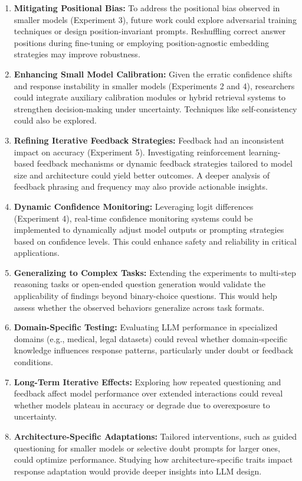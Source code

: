 \begin{enumerate}
    \item \textbf{Mitigating Positional Bias:} To address the positional bias observed in smaller models (Experiment 3), future work could explore adversarial training techniques or design position-invariant prompts. Reshuffling correct answer positions during fine-tuning or employing position-agnostic embedding strategies may improve robustness.
    
    \item \textbf{Enhancing Small Model Calibration:} Given the erratic confidence shifts and response instability in smaller models (Experiments 2 and 4), researchers could integrate auxiliary calibration modules or hybrid retrieval systems to strengthen decision-making under uncertainty. Techniques like self-consistency could also be explored.
    
    \item \textbf{Refining Iterative Feedback Strategies:} Feedback had an inconsistent impact on accuracy (Experiment 5). Investigating reinforcement learning-based feedback mechanisms or dynamic feedback strategies tailored to model size and architecture could yield better outcomes. A deeper analysis of feedback phrasing and frequency may also provide actionable insights.
    
    \item \textbf{Dynamic Confidence Monitoring:} Leveraging logit differences (Experiment 4), real-time confidence monitoring systems could be implemented to dynamically adjust model outputs or prompting strategies based on confidence levels. This could enhance safety and reliability in critical applications.
    
    \item \textbf{Generalizing to Complex Tasks:} Extending the experiments to multi-step reasoning tasks or open-ended question generation would validate the applicability of findings beyond binary-choice questions. This would help assess whether the observed behaviors generalize across task formats.
    
    \item \textbf{Domain-Specific Testing:} Evaluating LLM performance in specialized domains (e.g., medical, legal datasets) could reveal whether domain-specific knowledge influences response patterns, particularly under doubt or feedback conditions.
    
    \item \textbf{Long-Term Iterative Effects:} Exploring how repeated questioning and feedback affect model performance over extended interactions could reveal whether models plateau in accuracy or degrade due to overexposure to uncertainty.
    
    \item \textbf{Architecture-Specific Adaptations:} Tailored interventions, such as guided questioning for smaller models or selective doubt prompts for larger ones, could optimize performance. Studying how architecture-specific traits impact response adaptation would provide deeper insights into LLM design.
\end{enumerate}

